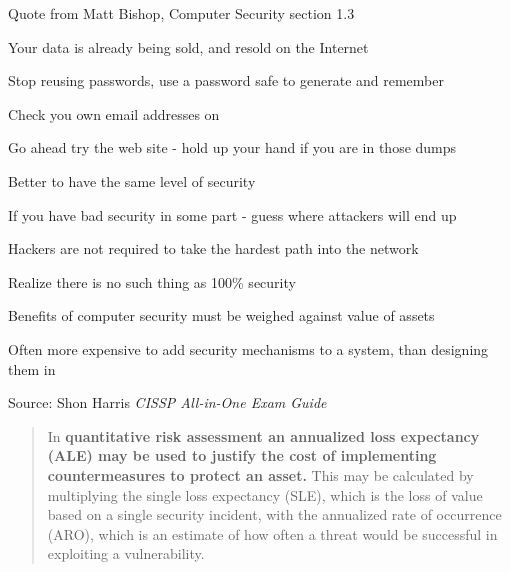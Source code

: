 \documentclass[Screen16to9,17pt]{foils}
\begin{document}
Quote from Matt Bishop, Computer Security section 1.3




\begin{list1}
\item Your data is already being sold, and resold on the Internet
\item Stop reusing passwords, use a password safe to generate and remember
\item Check you own email addresses on 
\end{list1}

\centerline{Go ahead try the web site - hold up your hand if you are in those dumps}





\begin{list1}
\item Better to have the same level of security
\item If you have bad security in some part - guess where attackers will end up
\item Hackers are not required to take the hardest path into the network
\item Realize there is no such thing as 100\% security
\end{list1}



\begin{list1}
\item Benefits of computer security must be weighed against value of assets
\item Often more expensive to add security mechanisms to a system, than designing them in
\end{list1}




Source: Shon Harris \emph{CISSP All-in-One Exam Guide}



\begin{quote}
In {\bf quantitative risk assessment an annualized loss expectancy (ALE) may be used to justify the cost of implementing countermeasures to protect an asset.} This may be calculated by multiplying the single loss expectancy (SLE), which is the loss of value based on a single security incident, with the annualized rate of occurrence (ARO), which is an estimate of how often a threat would be successful in exploiting a vulnerability.
\end{quote}
\end{document}
